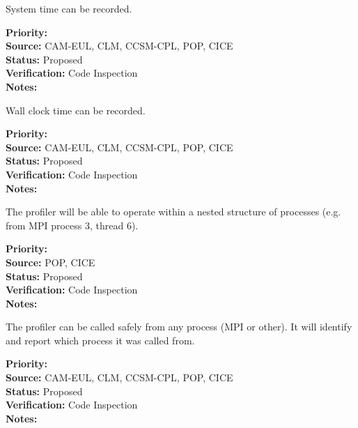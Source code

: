 
System time can be recorded.

\begin{reqlist}
{\bf Priority:}  \\
{\bf Source:} CAM-EUL, CLM, CCSM-CPL, POP, CICE \\
{\bf Status:} Proposed \\
{\bf Verification:} Code Inspection \\
{\bf Notes:} 
\end{reqlist}



Wall clock time can be recorded.

\begin{reqlist}
{\bf Priority:}  \\
{\bf Source:} CAM-EUL, CLM, CCSM-CPL, POP, CICE \\
{\bf Status:} Proposed \\
{\bf Verification:} Code Inspection \\
{\bf Notes:} 
\end{reqlist}


The profiler will be able to operate within a nested structure of processes (e.g.
from MPI process 3, thread 6).

\begin{reqlist}
{\bf Priority:}  \\
{\bf Source:}  POP, CICE \\
{\bf Status:} Proposed \\
{\bf Verification:} Code Inspection \\
{\bf Notes:} 
\end{reqlist}


The profiler can be called safely from any process (MPI or other).  It will 
identify and report which process it was called from.

\begin{reqlist}
{\bf Priority:}  \\
{\bf Source:} CAM-EUL, CLM, CCSM-CPL, POP, CICE \\
{\bf Status:} Proposed \\
{\bf Verification:} Code Inspection \\
{\bf Notes:} 
\end{reqlist}


